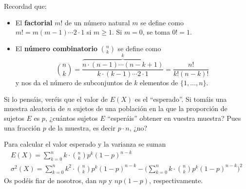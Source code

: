 \documentclass[
  spanish,
  letterpaper,
  DIV=11,
  numbers=noendperiod]{scrreprt}
\begin{document}
\begin{tcolorbox}[enhanced jigsaw, arc=.35mm, bottomrule=.15mm, bottomtitle=1mm, breakable, colback=white, colbacktitle=quarto-callout-important-color!10!white, colframe=quarto-callout-important-color-frame, coltitle=black, left=2mm, leftrule=.75mm, opacityback=0, opacitybacktitle=0.6, rightrule=.15mm, title=\textcolor{quarto-callout-important-color}{\faExclamation}\hspace{0.5em}{Importante}, titlerule=0mm, toprule=.15mm, toptitle=1mm]

Recordad que:

\begin{itemize}
\item
  El \textbf{factorial} \(m!\) de un número natural \(m\) se define como
  \(m!=m(m-1)\cdots 2\cdot 1\) si \(m\geqslant 1\). Si \(m=0\), se toma
  \(0!=1\).
\item
  El \textbf{número combinatorio} \(\binom{n}{k}\) se define como \[
  \binom{n}{k}=\frac{\overbrace{n\cdot (n-1)\cdots (n-k+1)}^k}{k\cdot (k-1)\cdots 2\cdot 1}=\frac{n!}{k!(n-k)!}
  \] y nos da el número de subconjuntos de \(k\) elementos de
  \(\{1,\ldots,n\}\).
\end{itemize}

\end{tcolorbox}

\begin{tcolorbox}[enhanced jigsaw, arc=.35mm, bottomrule=.15mm, bottomtitle=1mm, breakable, colback=white, colbacktitle=quarto-callout-important-color!10!white, colframe=quarto-callout-important-color-frame, coltitle=black, left=2mm, leftrule=.75mm, opacityback=0, opacitybacktitle=0.6, rightrule=.15mm, title=\textcolor{quarto-callout-important-color}{\faExclamation}\hspace{0.5em}{Importante}, titlerule=0mm, toprule=.15mm, toptitle=1mm]

Si lo pensáis, veréis que el valor de \(E(X)\) es el ``esperado''. Si
tomáis una muestra aleatoria de \(n\) sujetos de una población en la que
la proporción de sujetos \(E\) es \(p\), ¿cuántos sujetos \(E\)
``esperáis'' obtener en vuestra muestra? Pues una fracción \(p\) de la
muestra, es decir \(p\cdot n\), ¿no?

\end{tcolorbox}

Para calcular el valor esperado y la varianza se suman \[
\begin{array}{l}
\displaystyle E(X)=\sum_{k=0}^n k\cdot \binom{n}{k}p^k(1-p)^{n-k}\\
\displaystyle \sigma^2(X)=\sum_{k=0}^n k^2\cdot \binom{n}{k}p^k(1-p)^{n-k}-\Big(\sum_{k=0}^n k\cdot \binom{n}{k}p^k(1-p)^{n-k}\Big)^2
\end{array}
\] Os podéis fiar de nosotros, dan \(np\) y \(np(1-p)\),
respectivamente.
\end{document}
